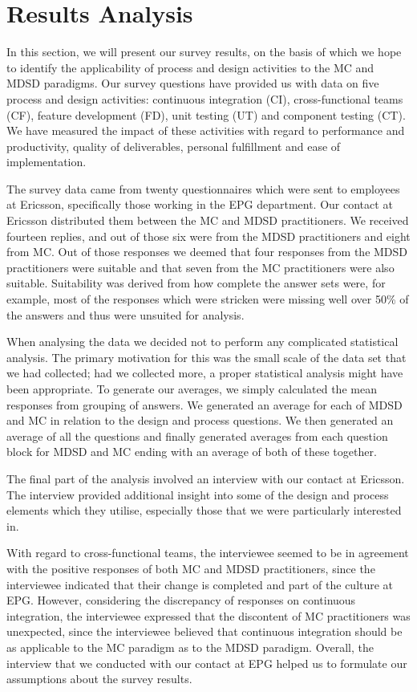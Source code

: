 \documentclass[final_report_innit.tex]{subfiles}
\begin{document}
\section{Results Analysis}

In this section, we will present our survey results, on the basis of which we hope to identify the applicability of process and design activities to the MC and MDSD paradigms. Our survey questions have provided us with data on five process and design activities: continuous integration (CI), cross-functional teams (CF), feature development (FD), unit testing (UT) and component testing (CT). We have measured the impact of these activities with regard to performance and productivity, quality of deliverables, personal fulfillment and ease of implementation.

The survey data came from twenty questionnaires which were sent to employees at Ericsson, specifically those working in the EPG department. Our contact at Ericsson distributed them between the MC and MDSD practitioners. We received fourteen replies, and out of those six were from the MDSD practitioners and eight from MC. Out of those responses we deemed that four responses from the MDSD practitioners were suitable and that seven from the MC practitioners were also suitable. Suitability was derived from how complete the answer sets were, for example, most of the responses which were stricken were missing well over 50\% of the answers and thus were unsuited for analysis.

When analysing the data we decided not to perform any complicated statistical analysis. The primary motivation for this was the small scale of the data set that we had collected; had we collected more, a proper statistical analysis might have been appropriate. To generate our averages, we simply calculated the mean responses from grouping of answers. We generated an average for each of MDSD and MC in relation to the design and process questions. We then generated an average of all the questions and finally generated averages from each question block for MDSD and MC ending with an average of both of these together.

The final part of the analysis involved an interview with our contact at Ericsson. The interview provided additional insight into some of the design and process elements which they utilise, especially those that we were particularly interested in.

With regard to cross-functional teams, the interviewee seemed to be in agreement with the positive responses of both MC and MDSD practitioners, since the interviewee indicated that their change is completed and part of the culture at EPG. However, considering the discrepancy of responses on continuous integration, the interviewee expressed that the discontent of MC practitioners was unexpected, since the interviewee believed that continuous integration should be as applicable to the MC paradigm as to the MDSD paradigm. Overall, the interview that we conducted with our contact at EPG helped us to formulate our assumptions about the survey results. 
\end{document}
